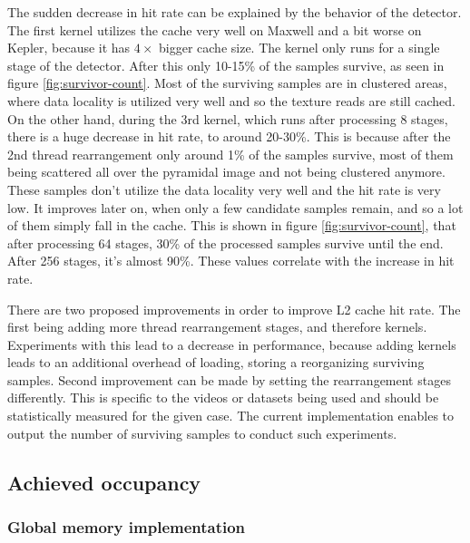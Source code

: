 The sudden decrease in hit rate can be explained by the behavior of the detector. The first kernel utilizes the cache very well on Maxwell and a bit worse on Kepler, because it has $4 \times$ bigger cache size. The kernel only runs for a single stage of the detector. After this only 10-15\% of the samples survive, as seen in figure \ref{fig:survivor-count}. Most of the surviving samples are in clustered areas, where data locality is utilized very well and so the texture reads are still cached. On the other hand, during the 3rd kernel, which runs after processing 8 stages, there is a huge decrease in hit rate, to around 20-30\%. This is because after the 2nd thread rearrangement only around 1\% of the samples survive, most of them being scattered all over the pyramidal image and not being clustered anymore. These samples don't utilize the data locality very well and the hit rate is very low. It improves later on, when only a few candidate samples remain, and so a lot of them simply fall in the cache. This is shown in figure \ref{fig:survivor-count}, that after processing 64 stages, 30\% of the processed samples survive until the end. After 256 stages, it's almost 90\%. These values correlate with the increase in hit rate.

There are two proposed improvements in order to improve L2 cache hit rate. The first being adding more thread rearrangement stages, and therefore kernels. Experiments with this lead to a decrease in performance, because adding kernels leads to an additional overhead of loading, storing a reorganizing surviving samples. Second improvement can be made by setting the rearrangement stages differently. This is specific to the videos or datasets being used and should be statistically measured for the given case. The current implementation enables to output the number of surviving samples to conduct such experiments.

\subsection{Achieved occupancy}\label{subsec:prof-achieved-occupancy}

\subsubsection{Global memory implementation}\label{subsubsec:prof-occ-global-memory}

